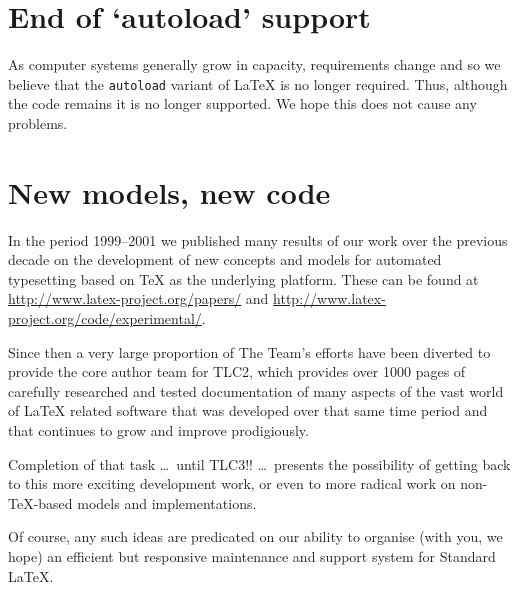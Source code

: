 \documentclass{ltnews}
\begin{document}
\section{End of `autoload' support}

As computer systems generally grow in capacity, requirements change
and so we believe that the \texttt{autoload} variant of \LaTeX{} is
no longer required.  Thus, although the code remains it is no longer
supported.  We hope this does not cause any problems.


\section{New models, new code}

In the period 1999--2001 we published many results of our work over
the previous decade on the development of new concepts and models
for automated typesetting based on \TeX{} as the underlying platform.
These can be found at \url{http://www.latex-project.org/papers/}
and
\mbox{\url{http://www.latex-project.org/code/experimental/}}.

Since then a very large proportion of The Team's efforts have been
diverted to provide the core author team for TLC2, which provides
over 1000 pages of carefully researched and tested documentation of
many aspects of the vast world of \LaTeX{} related software that
was developed over that same time period and that continues
to grow and improve prodigiously.

Completion of that task \ldots\ until TLC3!! \ldots\ presents the
possibility of getting back to this more exciting development work,
or even to more radical work on non-\TeX{}-based models and
implementations.

Of course, any such ideas are predicated on our ability to organise
(with you, we hope) an efficient\newline
but responsive maintenance and support system\newline
for Standard \LaTeX{}.
\end{document}
